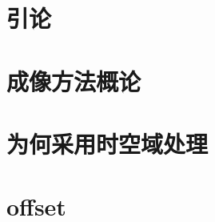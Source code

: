 %
%




\pagestyle{empty}

\frontmatter

%


\tableofcontents
\cleardoublepage
{}
\listoffigures
\cleardoublepage
{}
\listoftables

\mainmatter
\pagestyle{body}


\chapter*{引论}



\chapter{成像方法概论}








\chapter{为何采用时空域处理}
\label{chap:why-time-space}








\chapter{offset}
\label{chap:offset}

\appendix



